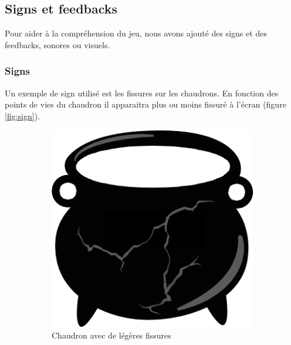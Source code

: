 \subsection{Signs et feedbacks}

Pour aider à la compréhension du jeu, nous avons ajouté des signs et des feedbacks, sonores ou visuels.

\subsubsection{Signs}
    Un exemple de sign utilisé est les fissures sur les chaudrons. En fonction des points de vies du chaudron il apparaitra plus ou moins fissuré à l'écran (figure \ref{fig:sign}).

    \FloatBarrier
    \begin{figure}[!ht]
        \centering
        \begin{subfigure}[t]{0.45\textwidth}
            \centering
            \includegraphics[width=\textwidth]{image/chaudron/chaudron2.png}
            \caption{Chaudron avec de légères fissures}
        \end{subfigure}
        \begin{subfigure}[t]{0.45\textwidth}
            \centering

\end{subfigure}
\end{figure}
